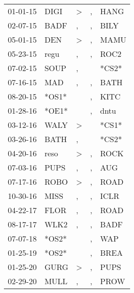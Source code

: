 \begin{supertabular}{lllll}
 01-01-15 &   DIGI &  \textgreater &  , &   HANG \\
 02-07-15 &   BADF &             , &  , &   BILY \\
 05-01-15 &    DEN &  \textgreater &  , &   MAMU \\
 05-23-15 &   regu &             , &  , &   ROC2 \\
 07-02-15 &   SOUP &             , &    &  *CS2* \\
 07-16-15 &    MAD &             , &  , &   BATH \\
 08-20-15 &  *OS1* &               &  , &   KITC \\
 01-28-16 &  *OE1* &               &  , &   dntu \\
 03-12-16 &   WALY &  \textgreater &    &  *CS1* \\
 03-26-16 &   BATH &             , &    &  *CS2* \\
 04-20-16 &   reso &  \textgreater &  , &   ROCK \\
 07-03-16 &   PUPS &             , &  , &    AUG \\
 07-17-16 &   ROBO &  \textgreater &  , &   ROAD \\
 10-30-16 &   MISS &             , &  , &   ICLR \\
 04-22-17 &   FLOR &             , &  , &   ROAD \\
 08-17-17 &   WLK2 &             , &  , &   BADF \\
 07-07-18 &  *OS2* &               &  , &    WAP \\
 01-25-19 &  *OS2* &               &  , &   BREA \\
 01-25-20 &   GURG &  \textgreater &  , &   PUPS \\
 02-29-20 &   MULL &             , &  , &   PROW \\
\end{supertabular}
